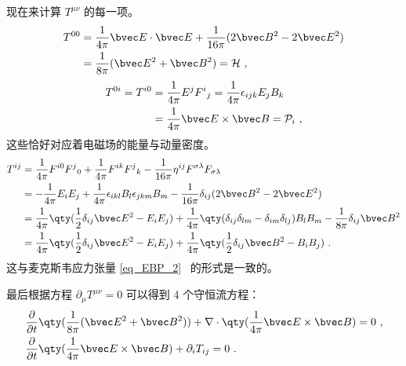 现在来计算 $T^{\mu\nu}$ 的每一项。
\begin{equation}\label{eq_EMtens_2}
\begin{aligned}
T^{00}&=\frac{1}{4\pi}\bvec E \cdot \bvec E+\frac{1}{16\pi}(2\bvec B^2-2\bvec E^2)\\
&=\frac{1}{8\pi}(\bvec E^2+\bvec B^2)=\mathcal{H}~,
\end{aligned}
\end{equation}
\begin{equation}\label{eq_EMtens_3}
\begin{aligned}
T^{0i}=T^{i0}&=\frac{1}{4\pi}E^j F^i{}_j=\frac{1}{4\pi}\epsilon_{ijk}E_jB_k\\
&=\frac{1}{4\pi}\bvec E\times \bvec B=\mathcal{P}_i~,
\end{aligned}
\end{equation}
这些恰好对应着电磁场的能量与动量密度。
\begin{equation}\label{eq_EMtens_4}
\begin{aligned}
T^{ij}&=\frac{1}{4\pi}F^{i0}F^j{}_0+\frac{1}{4\pi}F^{ik}F^j{}_k-\frac{1}{16\pi}\eta^{ij}F^{\sigma\lambda}F_{\sigma\lambda}\\
&=-\frac{1}{4\pi}E_iE_j+\frac{1}{4\pi}\epsilon_{ikl}B_l \epsilon_{jkm}B_m-\frac{1}{16\pi}\delta_{ij}(2\bvec B^2-2\bvec E^2)\\
&=\frac{1}{4\pi}\qty(\frac{1}{2}\delta_{ij}\bvec E^2-E_iE_j)+\frac{1}{4\pi}\qty(\delta_{ij}\delta_{lm}-\delta_{im}\delta_{lj})B_lB_m-\frac{1}{8\pi}\delta_{ij}\bvec B^2\\
&=\frac{1}{4\pi}\qty(\frac{1}{2}\delta_{ij}\bvec E^2-E_iE_j)+\frac{1}{4\pi}\qty(\frac{1}{2}\delta_{ij}\bvec B^2 - B_iB_j)~.
\end{aligned}
\end{equation}
这与麦克斯韦应力张量 \autoref{eq_EBP_2}~ 的形式是一致的。

最后根据方程 $\partial_\mu T^{\mu\nu}=0$ 可以得到 4 个守恒流方程：
\begin{equation}
\begin{aligned}
&\frac{\partial }{\partial t}\qty(\frac{1}{8\pi}(\bvec E^2+\bvec B^2))+\nabla \cdot \qty(\frac{1}{4\pi}\bvec E\times \bvec B)=0~,\\
&\frac{\partial}{\partial t}\qty(\frac{1}{4\pi}\bvec E\times \bvec B)+\partial_i T_{ij}=0~.
\end{aligned}
\end{equation}

